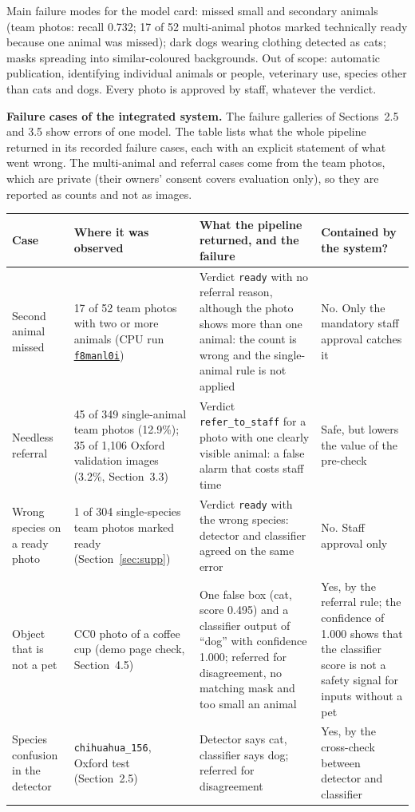 \documentclass[11pt,a4paper]{article}
\newcommand{\run}[1]{\href{https://wandb.ai/yasser-alhajlah-kaust/smart-pet-vision/runs/#1}{\texttt{#1}}}
\begin{document}
Main failure modes for the model card: missed small and secondary animals (team photos: recall 0.732; 17 of 52 multi-animal photos marked technically ready because one animal was missed); dark dogs wearing clothing detected as cats; masks spreading into similar-coloured backgrounds. Out of scope: automatic publication, identifying individual animals or people, veterinary use, species other than cats and dogs. Every photo is approved by staff, whatever the verdict.

\textbf{Failure cases of the integrated system.} The failure galleries of Sections~2.5 and 3.5 show errors of one model. The table lists what the whole pipeline returned in its recorded failure cases, each with an explicit statement of what went wrong. The multi-animal and referral cases come from the team photos, which are private (their owners' consent covers evaluation only), so they are reported as counts and not as images.

{\small
\begin{tabularx}{\linewidth}{@{}P{3.0cm} P{3.3cm} Y P{3.2cm}@{}}
\toprule
Case & Where it was observed & What the pipeline returned, and the failure & Contained by the system? \\
\midrule
Second animal missed & 17 of 52 team photos with two or more animals (CPU run \run{f8manl0i}) & Verdict \texttt{ready} with no referral reason, although the photo shows more than one animal: the count is wrong and the single-animal rule is not applied & No. Only the mandatory staff approval catches it \\
Needless referral & 45 of 349 single-animal team photos (12.9\%); 35 of 1,106 Oxford validation images (3.2\%, Section~3.3) & Verdict \texttt{refer\_to\_staff} for a photo with one clearly visible animal: a false alarm that costs staff time & Safe, but lowers the value of the pre-check \\
Wrong species on a ready photo & 1 of 304 single-species team photos marked ready (Section~\ref{sec:supp}) & Verdict \texttt{ready} with the wrong species: detector and classifier agreed on the same error & No. Staff approval only \\
Object that is not a pet & CC0 photo of a coffee cup (demo page check, Section~4.5) & One false box (cat, score 0.495) and a classifier output of ``dog'' with confidence 1.000; referred for disagreement, no matching mask and too small an animal & Yes, by the referral rule; the confidence of 1.000 shows that the classifier score is not a safety signal for inputs without a pet \\
Species confusion in the detector & \texttt{chihuahua\_156}, Oxford test (Section~2.5) & Detector says cat, classifier says dog; referred for disagreement & Yes, by the cross-check between detector and classifier \\
\bottomrule
\end{tabularx}}
\end{document}
